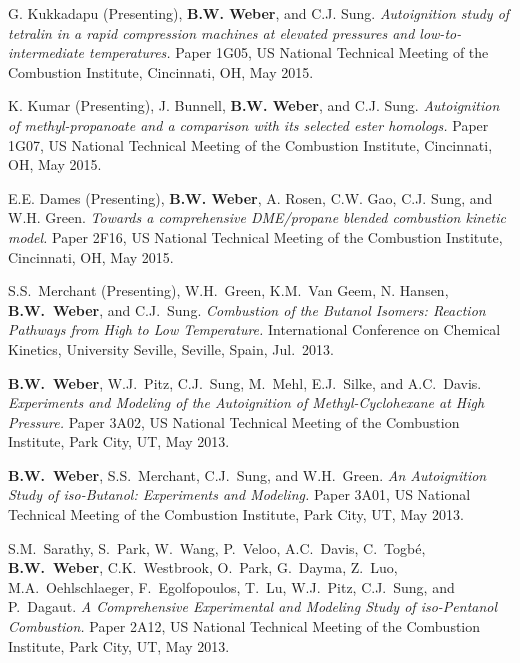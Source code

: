 \begin{bibmune}
\item G. Kukkadapu (Presenting), \textbf{B.W. Weber}, and C.J. Sung. \textit{Autoignition study
        of tetralin in a rapid compression machines at elevated
        pressures and low-to-intermediate temperatures.}
        Paper 1G05,  US National Technical Meeting of the
        Combustion Institute, Cincinnati, OH, May 2015.

\item K. Kumar (Presenting), J. Bunnell, \textbf{B.W. Weber}, and C.J. Sung.
        \textit{Autoignition of methyl-propanoate
        and a comparison with its selected ester homologs.}
        Paper 1G07,  US National Technical Meeting of the
        Combustion Institute, Cincinnati, OH, May 2015.

\item E.E. Dames (Presenting), \textbf{B.W. Weber}, A. Rosen, C.W. Gao, C.J. Sung,
        and W.H. Green. \textit{Towards a comprehensive DME/propane blended
        combustion kinetic model.}
        Paper 2F16,  US National Technical Meeting of the
        Combustion Institute, Cincinnati, OH, May 2015.

\item S.S.\ Merchant (Presenting), W.H.\ Green, K.M.\ Van Geem, N.
        Hansen, \textbf{B.W.\ Weber}, and C.J.\ Sung.
        \textit{Combustion of the Butanol Isomers: Reaction Pathways
        from High to Low Temperature.}  International
        Conference on Chemical Kinetics, University Seville, Seville,
        Spain, Jul.\ 2013.

\item \textbf{B.W.\ Weber}, W.J.\ Pitz, C.J.\ Sung, M.\ Mehl,
        E.J.\ Silke, and A.C.\ Davis. \textit{Experiments and Modeling of
        the Autoignition of Methyl-Cyclohexane at High Pressure.}
        Paper 3A02,  US National Technical Meeting of the
        Combustion Institute, Park City, UT, May 2013.

\item \textbf{B.W.\ Weber}, S.S.\ Merchant, C.J.\ Sung, and W.H.\ Green.
        \textit{An Autoignition Study of iso-Butanol: Experiments and
        Modeling.} Paper 3A01,  US National Technical
        Meeting of the Combustion Institute, Park City, UT, May 2013.

\item S.M.\ Sarathy, S.\ Park, W.\ Wang, P.\ Veloo, A.C.\ Davis,
        C.\ Togbé, \textbf{B.W.\ Weber}, C.K.\ Westbrook, O.\ Park,
        G.\ Dayma, Z.\ Luo, M.A.\ Oehlschlaeger, F.\ Egolfopoulos, T.\ Lu,
        W.J.\ Pitz, C.J.\ Sung, and P.\ Dagaut. \textit{A Comprehensive
        Experimental and Modeling Study of iso-Pentanol Combustion.}
        Paper 2A12,  US National Technical Meeting of the
        Combustion Institute, Park City, UT, May 2013.


\end{bibmune}
